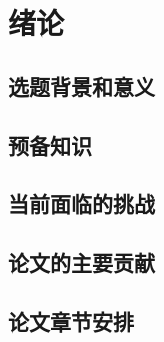 \chapter{绪论}\label{cha:intro}

\section{选题背景和意义}\label{sec:background}

\section{预备知识}\label{sec:preliminaries}

\section{当前面临的挑战}\label{sec:challenge}

\section{论文的主要贡献}\label{sec:contribution}

\section{论文章节安排}\label{sec:structure}